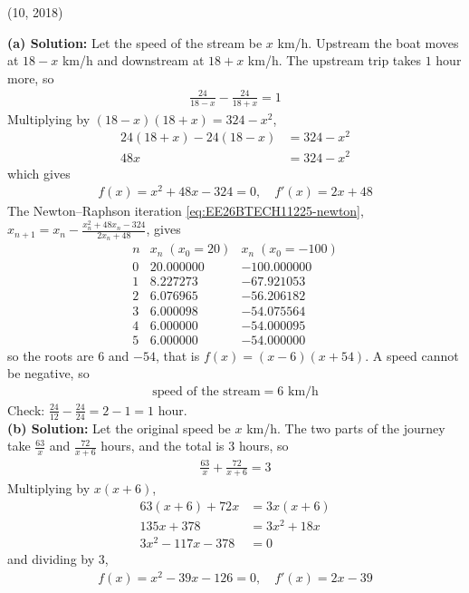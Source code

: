 \begin{enumerate}[label=\thesubsection.\arabic*, ref=\thesubsection.\theenumi]
\par\hfill (10, 2018)\par
\textbf{(a) Solution:} Let the speed of the stream be $x$ km/h. Upstream the boat moves at $18 - x$ km/h and downstream at $18 + x$ km/h. The upstream trip takes $1$ hour more, so
\begin{align}
\frac{24}{18 - x} - \frac{24}{18 + x} = 1
\end{align}
Multiplying by $(18 - x)(18 + x) = 324 - x^2$,
\begin{align*}
24(18 + x) - 24(18 - x) &= 324 - x^2 \\
48x &= 324 - x^2
\end{align*}
which gives
\begin{align}
f(x) = x^2 + 48x - 324 = 0, \quad f'(x) = 2x + 48
\end{align}
The Newton--Raphson iteration \eqref{eq:EE26BTECH11225-newton}, $x_{n+1} = x_n - \frac{x_n^2 + 48x_n - 324}{2x_n + 48}$, gives
\[
\begin{array}{c|r|r}
n & x_n\;(x_0=20) & x_n\;(x_0=-100)\\\hline
0 & 20.000000 & -100.000000 \\
1 & 8.227273 & -67.921053 \\
2 & 6.076965 & -56.206182 \\
3 & 6.000098 & -54.075564 \\
4 & 6.000000 & -54.000095 \\
5 & 6.000000 & -54.000000
\end{array}
\]
so the roots are $6$ and $-54$, that is $f(x) = (x - 6)(x + 54)$. A speed cannot be negative, so
\begin{align}
\boxed{\text{speed of the stream} = 6 \text{ km/h}}
\end{align}
Check: $\frac{24}{12} - \frac{24}{24} = 2 - 1 = 1$ hour. \\[8pt]
\textbf{(b) Solution:} Let the original speed be $x$ km/h. The two parts of the journey take $\frac{63}{x}$ and $\frac{72}{x+6}$ hours, and the total is $3$ hours, so
\begin{align}
\frac{63}{x} + \frac{72}{x + 6} = 3
\end{align}
Multiplying by $x(x + 6)$,
\begin{align*}
63(x + 6) + 72x &= 3x(x + 6) \\
135x + 378 &= 3x^2 + 18x \\
3x^2 - 117x - 378 &= 0
\end{align*}
and dividing by $3$,
\begin{align}
f(x) = x^2 - 39x - 126 = 0, \quad f'(x) = 2x - 39

\end{align}
\end{enumerate}
